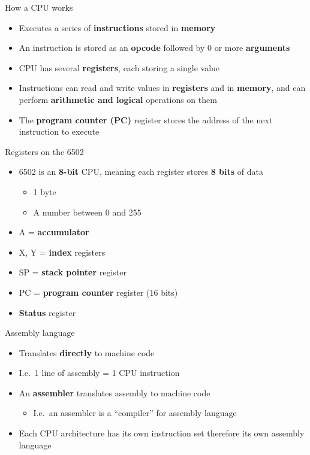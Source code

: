\begin{frame}{How a CPU works}
	\begin{itemize}
		\pause\item Executes a series of \textbf{instructions} stored in \textbf{memory}
		\pause\item An instruction is stored as an \textbf{opcode} followed by 0 or more \textbf{arguments}
		\pause\item CPU has several \textbf{registers}, each storing a single value
		\pause\item Instructions can read and write values in \textbf{registers} and in \textbf{memory},
			and can perform \textbf{arithmetic and logical} operations on them
		\pause\item The \textbf{program counter (PC)} register stores the address of the next instruction to execute
	\end{itemize}
\end{frame}

\begin{frame}{Registers on the 6502}
	\begin{itemize}
		\pause\item 6502 is an \textbf{8-bit} CPU, meaning each register stores \textbf{8 bits} of data
			\begin{itemize}
				\pause\item 1 byte
				\pause\item A number between 0 and 255
			\end{itemize}
		\pause\item A = \textbf{accumulator}
		\pause\item X, Y = \textbf{index} registers
		\pause\item SP = \textbf{stack pointer} register
		\pause\item PC = \textbf{program counter} register (16 bits)
		\pause\item \textbf{Status} register
	\end{itemize}
\end{frame}

\begin{frame}{Assembly language}
	\begin{itemize}
		\pause\item Translates \textbf{directly} to machine code
		\pause\item I.e.\ 1 line of assembly = 1 CPU instruction
		\pause\item An \textbf{assembler} translates assembly to machine code
			\begin{itemize}
				\pause\item I.e.\ an assembler is a ``compiler'' for assembly language
			\end{itemize}
		\pause\item Each CPU architecture has its own instruction set therefore
			its own assembly language
	\end{itemize}
\end{frame}

